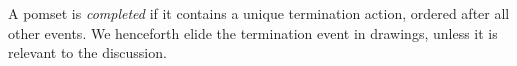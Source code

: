 
A pomset is \emph{completed} if it contains a unique termination action,
ordered after all other events.  We henceforth elide the
termination event in drawings, unless it is relevant to the discussion.





